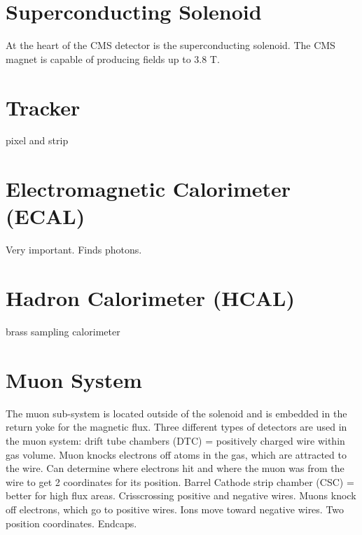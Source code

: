 \section{Superconducting Solenoid}
\label{sec:magnet}

At the heart of the CMS detector is the superconducting solenoid. The CMS magnet is capable of producing fields up to 3.8 T. 

\section{Tracker}
\label{sec:Tracker}

pixel and strip

\section{Electromagnetic Calorimeter (ECAL)}
\label{sec:ECAL}

Very important. Finds photons.

\section{Hadron Calorimeter (HCAL)}
\label{sec:HCAL}

brass sampling calorimeter

\section{Muon System}
\label{sec:Muon}

The muon sub-system is located outside of the solenoid and is embedded in the return yoke for the magnetic flux. Three different types of detectors are used in the muon system: drift tube chambers (DTC) = positively charged wire within gas volume. Muon knocks electrons off atoms in the gas, which are attracted to the wire. Can determine where electrons hit and where the muon was from the wire to get 2 coordinates for its position. Barrel
Cathode strip chamber (CSC) = better for high flux areas. Crisscrossing positive and negative wires. Muons knock off electrons, which go to positive wires. Ions move toward negative wires. Two position coordinates. Endcaps.


